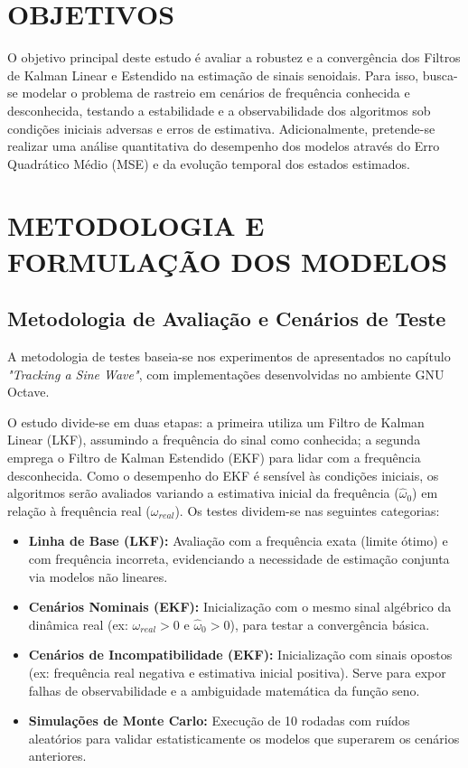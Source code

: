 \documentclass[a4paper,12pt]{article}
\begin{document}
\section{OBJETIVOS}
\label{sec:objetivos}

O objetivo principal deste estudo é avaliar a robustez e a convergência dos Filtros de Kalman Linear e Estendido na estimação de sinais senoidais. Para isso, busca-se modelar o problema de rastreio em cenários de frequência conhecida e desconhecida, testando a estabilidade e a observabilidade dos algoritmos sob condições iniciais adversas e erros de estimativa. Adicionalmente, pretende-se realizar uma análise quantitativa do desempenho dos modelos através do Erro Quadrático Médio (MSE) e da evolução temporal dos estados estimados.

\section{METODOLOGIA E FORMULAÇÃO DOS MODELOS}
\label{sec:metodologia_e_modelos}

\subsection{Metodologia de Avaliação e Cenários de Teste}
\label{subsec:metodologia_testes}

A metodologia de testes baseia-se nos experimentos de  apresentados no capítulo \textit{"Tracking a Sine Wave"}, com implementações desenvolvidas no ambiente GNU Octave. 

O estudo divide-se em duas etapas: a primeira utiliza um Filtro de Kalman Linear (LKF), assumindo a frequência do sinal como conhecida; a segunda emprega o Filtro de Kalman Estendido (EKF) para lidar com a frequência desconhecida. Como o desempenho do EKF é sensível às condições iniciais, os algoritmos serão avaliados variando a estimativa inicial da frequência ($\hat{\omega}_0$) em relação à frequência real ($\omega_{real}$). Os testes dividem-se nas seguintes categorias:

\begin{itemize}
    \item \textbf{Linha de Base (LKF):} Avaliação com a frequência exata (limite ótimo) e com frequência incorreta, evidenciando a necessidade de estimação conjunta via modelos não lineares.
    \item \textbf{Cenários Nominais (EKF):} Inicialização com o mesmo sinal algébrico da dinâmica real (ex: $\omega_{real} > 0$ e $\hat{\omega}_0 > 0$), para testar a convergência básica.
    \item \textbf{Cenários de Incompatibilidade (EKF):} Inicialização com sinais opostos (ex: frequência real negativa e estimativa inicial positiva). Serve para expor falhas de observabilidade e a ambiguidade matemática da função seno.
    \item \textbf{Simulações de Monte Carlo:} Execução de 10 rodadas com ruídos aleatórios para validar estatisticamente os modelos que superarem os cenários anteriores.
\end{itemize}
\end{document}
